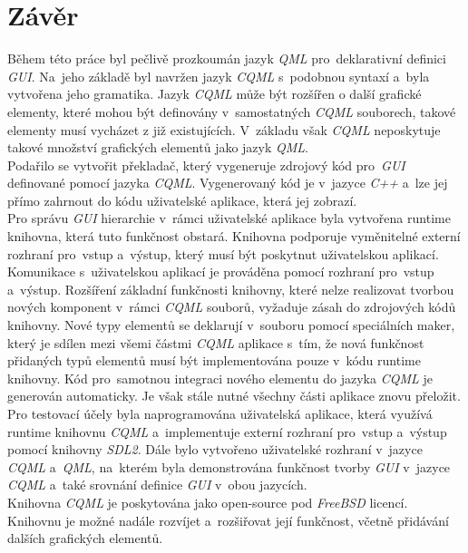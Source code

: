 \documentclass[11pt,twoside,a4paper]{book}
\begin{document}
\chapter{Závěr}
Během této práce byl pečlivě prozkoumán jazyk \textit{QML} pro~deklarativní definici \textit{GUI}. Na~jeho základě byl navržen jazyk \textit{CQML} s~podobnou syntaxí a~byla vytvořena jeho gramatika. Jazyk \textit{CQML} může být rozšířen o další grafické elementy, které mohou být definovány v~samostatných \textit{CQML} souborech, takové elementy musí vycházet z již existujících. V~základu však \textit{CQML} neposkytuje takové množství grafických elementů jako jazyk \textit{QML}.\\
Podařilo se vytvořit překladač, který vygeneruje zdrojový kód pro~\textit{GUI} definované pomocí jazyka \textit{CQML}. Vygenerovaný kód je v~jazyce \textit{C++} a~lze jej přímo zahrnout do kódu uživatelské aplikace, která jej zobrazí.\\
Pro správu \textit{GUI} hierarchie v~rámci uživatelské aplikace byla vytvořena runtime knihovna, která tuto funkčnost obstará. Knihovna podporuje vyměnitelné externí rozhraní pro~vstup a~výstup, který musí být poskytnut uživatelskou aplikací. Komunikace s~uživatelskou aplikací je prováděna pomocí rozhraní pro~vstup a~výstup. 
Rozšíření základní funkčnosti knihovny, které nelze realizovat tvorbou nových komponent v~rámci \textit{CQML} souborů, vyžaduje zásah do zdrojových kódů knihovny. Nové typy elementů se deklarují v~souboru  pomocí speciálních maker, který je sdílen mezi všemi částmi \textit{CQML} aplikace s~tím, že nová funkčnost přidaných typů elementů musí být implementována pouze v~kódu runtime knihovny. Kód pro~samotnou integraci nového elementu do jazyka \textit{CQML} je generován automaticky. Je však stále nutné všechny části aplikace znovu přeložit.\\
Pro testovací účely byla naprogramována uživatelská aplikace, která využívá runtime knihovnu \textit{CQML} a~implementuje externí rozhraní pro~vstup a~výstup pomocí knihovny \textit{SDL2}. Dále bylo vytvořeno uživatelské rozhraní v~jazyce \textit{CQML} a~\textit{QML}, na~kterém byla demonstrována funkčnost tvorby \textit{GUI} v~jazyce \textit{CQML} a~také srovnání definice \textit{GUI} v~obou jazycích.\\
Knihovna \textit{CQML} je poskytována jako open-source pod \textit{FreeBSD} licencí. Knihovnu je možné nadále rozvíjet a~rozšiřovat její funkčnost, včetně přidávání dalších grafických elementů.
\end{document}
